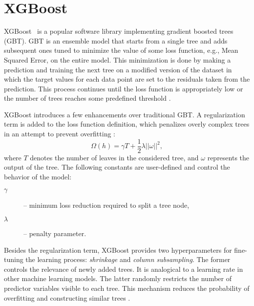 \documentclass[../main.tex]{subfiles}
\begin{document}

\section{XGBoost}
\label{sec:models_xgboost}
XGBoost~\cite{xgboost} is a popular software library implementing gradient boosted trees (GBT). GBT is an ensemble model that starts from a single tree and adds subsequent ones tuned to minimize the value of some loss function, e.g., Mean Squared Error, on the entire model. This minimization is done by making a prediction and training the next tree on a modified version of the dataset in which the target values for each data point are set to the residuals taken from the prediction. This process continues until the loss function is appropriately low or the number of trees reaches some predefined threshold \cite{surveyofensemblelearning2022}.

XGBoost introduces a few enhancements over traditional GBT. A regularization term is added to the loss function definition, which penalizes overly complex trees in an attempt to prevent overfitting \cite{surveyofensemblelearning2022}:
\begin{equation}
\Omega(h) = \gamma T + \frac{1}{2}\lambda||\omega||^2,
\end{equation}
where $T$ denotes the number of leaves in the considered tree, and $\omega$ represents the output of the tree. The following constants are user-defined and control the behavior of the model:
\begin{description}
    \item[$\gamma$] -- minimum loss reduction required to split a tree node,
    \item[$\lambda$] -- penalty parameter.
\end{description}
Besides the regularization term, XGBoost provides two hyperparameters for fine-tuning the learning process: \emph{shrinkage} and \emph{column subsampling}. The former controls the relevance of newly added trees. It is analogical to a learning rate in other machine learning models. The latter randomly restricts the number of predictor variables visible to each tree. This mechanism reduces the probability of overfitting and constructing similar trees \cite{xgboostpaper2016}.
\end{document}
